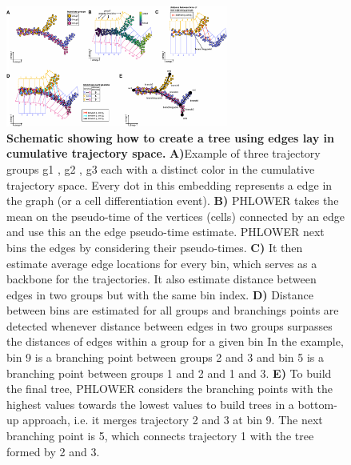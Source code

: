 \begin{figure}[!ht]
    \centering
    \includegraphics[width=0.65\textwidth]{branching/fig}
    \vspace{0.1cm}
    \caption[Schematic showing how to create a PHLOWER tree.]{\textbf{Schematic showing how to create a tree using edges lay in cumulative trajectory space.}  \textbf{A)}Example of three trajectory groups g1 , g2 , g3 each with a distinct color in the cumulative trajectory space. Every dot in this embedding represents a edge in the graph (or a cell differentiation event). \textbf{B)} PHLOWER takes the mean on the pseudo-time of the vertices (cells) connected by an edge and use this an the edge pseudo-time estimate. PHLOWER next bins the edges by considering their pseudo-times. \textbf{C)} It then estimate average edge locations for every bin, which serves as a backbone for the trajectories. It also estimate distance between edges in two groups but with the same bin index. \textbf{D)} Distance between bins are estimated for all groups and branchings points are detected whenever distance between edges in two groups surpasses the distances of edges within a group for a given bin In the example, bin 9 is a branching point between groups 2 and 3 and bin 5 is a branching point between groups 1 and 2 and 1 and 3. \textbf{E)} To build the final tree, PHLOWER considers the branching points with the highest values towards the lowest values to build trees in a bottom-up approach, i.e. it merges trajectory 2 and 3 at bin 9. The next branching point is 5, which connects trajectory 1 with the tree formed by 2 and 3.}
    \label{fig:branching}
\end{figure}




